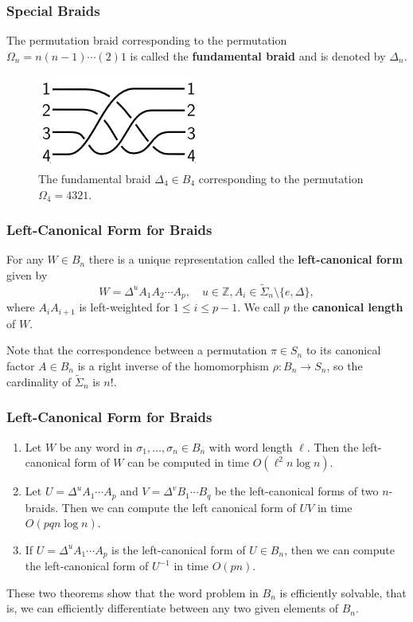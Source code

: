 \documentclass{beamer}
\newcommand{\integers}{\mathbb{Z}}
\begin{document}
\begin{frame}
	\frametitle{Special Braids}
	\begin{definition}
		The permutation braid corresponding to the permutation $\Omega_n = n(n-1)\cdots(2)1$ is called the \textbf{fundamental braid} and is denoted by $\Delta_n$.
	\end{definition}\pause
	\vfill
	\begin{figure}[h]
		\centering
		\includegraphics[scale=.7]{fundamental.png}
		\caption{The fundamental braid $\Delta_4\in B_4$ corresponding to the permutation $\Omega_4 = 4321$.}
	\end{figure}
\end{frame}

\begin{frame}
	\frametitle{Left-Canonical Form for Braids}
	\begin{theorem}
		For any $W\in B_n$ there is a unique representation called the \textbf{left-canonical form} given by
		\[
		W = \Delta^uA_1A_2\cdots A_p,\quad u\in \integers, A_i\in \tilde{\Sigma}_n\setminus \{e, \Delta\},
		\]
		where $A_iA_{i+1}$ is left-weighted for $1\leq i\leq p-1$. We call $p$ the \textbf{canonical length} of $W$.
	\end{theorem}\pause
	Note that the correspondence between a permutation $\pi \in S_n$ to its canonical factor $A\in B_n$ is a right inverse of the homomorphism $\rho: B_n\to S_n$, so the cardinality of $\tilde{\Sigma}_n$ is $n!$. 
\end{frame}

\begin{frame}
	\frametitle{Left-Canonical Form for Braids}
	\begin{theorem}
	\begin{enumerate}
		\item Let $W$ be any word in $\sigma_1, \ldots, \sigma_n\in B_n$ with word length $\ell$. Then the left-canonical form of $W$ can be computed in time $O(\ell^2 n\log n)$.\pause
		\item Let $U = \Delta^uA_1\cdots A_p$ and $V = \Delta^vB_1\cdots B_q$ be the left-canonical forms of two $n$-braids. Then we can compute the left canonical form of $UV$ in time $O(pqn\log n)$.\pause
		\item If $U = \Delta^uA_1\cdots A_p$ is the left-canonical form of $U\in B_n$, then we can compute the left-canonical form of $U^{-1}$ in time $O(pn)$.\pause
	\end{enumerate}
	\end{theorem}
	These two theorems show that the word problem in $B_n$ is efficiently solvable, that is, we can efficiently differentiate between any two given elements of $B_n$.
\end{frame}
\end{document}
